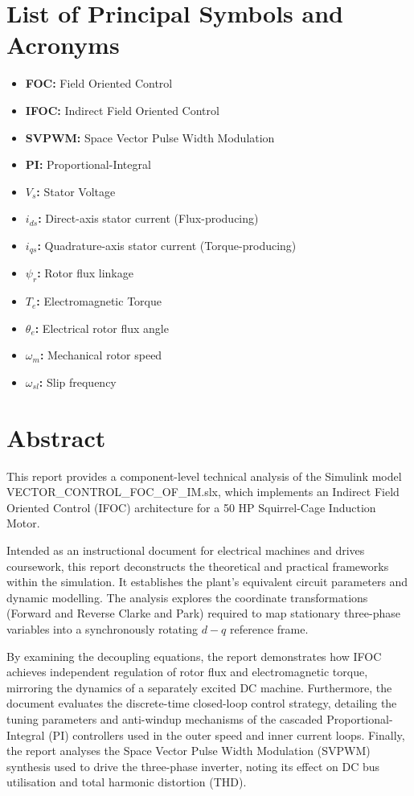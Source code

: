\documentclass[12pt,a4paper]{report}
\begin{document}
\chapter*{List of Principal Symbols and Acronyms}
\begin{itemize}
    \item \textbf{FOC:} Field Oriented Control
    \item \textbf{IFOC:} Indirect Field Oriented Control
    \item \textbf{SVPWM:} Space Vector Pulse Width Modulation
    \item \textbf{PI:} Proportional-Integral
    \item \textbf{$V_s$:} Stator Voltage
    \item \textbf{$i_{ds}$:} Direct-axis stator current (Flux-producing)
    \item \textbf{$i_{qs}$:} Quadrature-axis stator current (Torque-producing)
    \item \textbf{$\psi_r$:} Rotor flux linkage
    \item \textbf{$T_e$:} Electromagnetic Torque
    \item \textbf{$\theta_e$:} Electrical rotor flux angle
    \item \textbf{$\omega_m$:} Mechanical rotor speed
    \item \textbf{$\omega_{sl}$:} Slip frequency
\end{itemize}

\chapter*{Abstract}
This report provides a component-level technical analysis of the Simulink model \\ VECTOR\_CONTROL\_FOC\_OF\_IM.slx, which implements an Indirect Field Oriented Control (IFOC) architecture for a 50 HP Squirrel-Cage Induction Motor.

Intended as an instructional document for electrical machines and drives coursework, this report deconstructs the theoretical and practical frameworks within the simulation. It establishes the plant's equivalent circuit parameters and dynamic modelling. The analysis explores the coordinate transformations (Forward and Reverse Clarke and Park) required to map stationary three-phase variables into a synchronously rotating $d-q$ reference frame.

By examining the decoupling equations, the report demonstrates how IFOC achieves independent regulation of rotor flux and electromagnetic torque, mirroring the dynamics of a separately excited DC machine. Furthermore, the document evaluates the discrete-time closed-loop control strategy, detailing the tuning parameters and anti-windup mechanisms of the cascaded Proportional-Integral (PI) controllers used in the outer speed and inner current loops. Finally, the report analyses the Space Vector Pulse Width Modulation (SVPWM) synthesis used to drive the three-phase inverter, noting its effect on DC bus utilisation and total harmonic distortion (THD).
\end{document}

